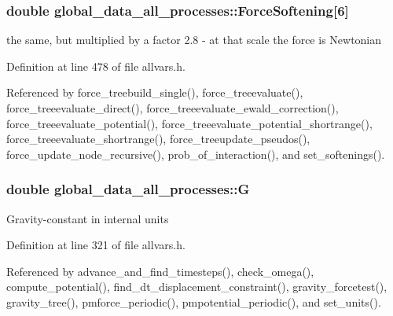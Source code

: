 \hypertarget{structglobal__data__all__processes_a2f875884085b35ff64047e46f5348be4}{
\subsubsection[{ForceSoftening}]{\setlength{\rightskip}{0pt plus 5cm}double {\bf global\_\-data\_\-all\_\-processes::ForceSoftening}\mbox{[}6\mbox{]}}}
\label{structglobal__data__all__processes_a2f875884085b35ff64047e46f5348be4}
the same, but multiplied by a factor 2.8 -\/ at that scale the force is Newtonian 

Definition at line 478 of file allvars.h.



Referenced by force\_\-treebuild\_\-single(), force\_\-treeevaluate(), force\_\-treeevaluate\_\-direct(), force\_\-treeevaluate\_\-ewald\_\-correction(), force\_\-treeevaluate\_\-potential(), force\_\-treeevaluate\_\-potential\_\-shortrange(), force\_\-treeevaluate\_\-shortrange(), force\_\-treeupdate\_\-pseudos(), force\_\-update\_\-node\_\-recursive(), prob\_\-of\_\-interaction(), and set\_\-softenings().

\hypertarget{structglobal__data__all__processes_a1250b5c6e116b576ff09cbcd928d2063}{
\subsubsection[{G}]{\setlength{\rightskip}{0pt plus 5cm}double {\bf global\_\-data\_\-all\_\-processes::G}}}
\label{structglobal__data__all__processes_a1250b5c6e116b576ff09cbcd928d2063}
Gravity-\/constant in internal units 

Definition at line 321 of file allvars.h.



Referenced by advance\_\-and\_\-find\_\-timesteps(), check\_\-omega(), compute\_\-potential(), find\_\-dt\_\-displacement\_\-constraint(), gravity\_\-forcetest(), gravity\_\-tree(), pmforce\_\-periodic(), pmpotential\_\-periodic(), and set\_\-units().

